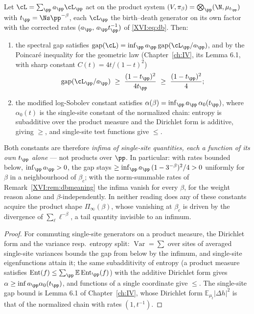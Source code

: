 \begin{theorem}\label{XVI:thm:tensorise}
Let $\cL=\sum_\pp a_\pp\cL_\pp$ act on the product system $(V,\pi_\beta)=\bigotimes_\pp(\N,\mu_{t_\pp})$
with $t_\pp=\Ns\pp^{-\beta}$, each $\cL_\pp$ the birth--death generator on its own factor
with the corrected rates $(a_\pp,\,a_\pp t_\pp^{-1})$ of \eqref{XVI:eq:db}. Then:
\begin{enumerate}
\item the spectral gap satisfies $\operatorname{gap}(\cL)=\inf_{\pp}a_\pp\operatorname{gap}(\cL_\pp/a_\pp)$, and by the
Poincar\'e inequality for the geometric law (Chapter~\ref{ch:IV}, its Lemma 6.1, with sharp constant
$C(t)=4t/(1-t)^2$)
\[
\operatorname{gap}(\cL_\pp/a_\pp)\ \ge\ \frac{(1-t_\pp)^2}{4t_\pp}\ \ge\ \frac{(1-t_\pp)^2}{4};
\]
\item the modified log-Sobolev constant satisfies
$\alpha(\beta)=\inf_{\pp}a_\pp\,\alpha_0(t_\pp)$, where $\alpha_0(t)$ is the single-site
constant of the normalized chain: entropy is subadditive over the product measure and the
Dirichlet form is additive, giving $\ge$, and single-site test functions give $\le$.
\end{enumerate}
Both constants are therefore \emph{infima of single-site quantities, each a function of its
own $t_\pp$ alone} --- not products over $\pp$. In particular: with rates bounded below,
$\inf_\pp a_\pp>0$, the gap stays $\ge\inf_\pp a_\pp\,(1-3^{-\beta})^2/4>0$ uniformly for
$\beta$ in a neighbourhood of $\beta_c$; with the norm-summable rates of
Remark~\ref{XVI:rem:dbmeaning} the infima vanish for every $\beta$, for the weight reason
alone and $\beta$-independently. In neither reading does any of these constants acquire the
product shape $\Pi_\infty(\beta)$, whose vanishing at $\beta_c$ is driven by the divergence
of $\sum_\ell\ell^{-\beta}$, a tail quantity invisible to an infimum.
\end{theorem}

\begin{proof}
For commuting single-site generators on a product measure, the Dirichlet form and the
variance resp.\ entropy split: $\operatorname{Var}=\sum$ over sites of averaged single-site
variances bounds the gap from below by the infimum, and single-site eigenfunctions attain
it; the same subadditivity of entropy (a product measure satisfies
$\operatorname{Ent}(f)\le\sum_\pp\mathbb E\operatorname{Ent}_\pp(f)$) with the additive
Dirichlet form gives $\alpha\ge\inf a_\pp\alpha_0(t_\pp)$, and functions of a single
coordinate give $\le$. The single-site gap bound is Lemma 6.1 of Chapter~\ref{ch:IV}, whose Dirichlet
form $\mathbb E_{\mu_t}|\Delta h|^2$ is that of the normalized chain with rates $(1,t^{-1})$.
\end{proof}

